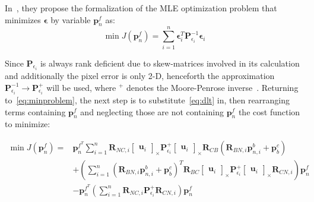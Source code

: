 In~\cite{absolute-triangulation}, they propose the formalization of the MLE optimization problem that minimizes $\boldsymbol{\epsilon}$ by variable $\mathbf{p}_n^f$ as:
\begin{equation}
    \min J(\mathbf{p}_n^f)=\sum_{i=1}^n\boldsymbol{\epsilon}_i^T\mathbf{P}_{\epsilon_i}^{-1}\boldsymbol{\epsilon}_i
    \label{eq:minproblem}
\end{equation}

Since $\mathbf{P}_{\epsilon_i}$ is always rank deficient due to skew-matrices involved in its calculation and additionally the pixel error is only 2-D, henceforth the approximation $\mathbf{P}_{\epsilon_i}^{-1}\rightarrow\mathbf{P}_{\epsilon_i}^{+}$ will be used, where $^+$ denotes the Moore-Penrose inverse~\cite{moorepenrose}. Returning to~\eqref{eq:minproblem}, the next step is to substitute~\eqref{eq:dlt} in, then rearranging terms containing $\mathbf{p}_n^f$ and neglecting those are not containing $\mathbf{p}_n^f$ the cost function to minimize:

\begin{equation}
\begin{aligned}
    \min J(\mathbf{p}_n^f) = & \mathbf{p}_n^{f^T}\sum_{i=1}^n \mathbf{R}_{NC, i}\begin{bmatrix}
        \mathbf{u}_i
    \end{bmatrix}_\times \mathbf{P}_{\epsilon_i}^{+} 
    \begin{bmatrix}
        \mathbf{u}_i
    \end{bmatrix}_\times
    \mathbf{R}_{CB}(\mathbf{R}_{BN, i}\mathbf{p}_{n, i}^b + \mathbf{p}_b^c) \\ &
     + \left(\sum_{i=1}^n{(\mathbf{R}_{BN, i}\mathbf{p}_{n, i}^b + \mathbf{p}_b^c)}^T\mathbf{R}_{BC}
    \begin{bmatrix}
        \mathbf{u}_i
    \end{bmatrix}_\times \mathbf{P}_{\epsilon_i}^{+}
    \begin{bmatrix}
        \mathbf{u}_i
    \end{bmatrix}_\times \mathbf{R}_{CN, i}\right) \mathbf{p}_n^f \\ &
    -\mathbf{p}_n^{f^T}\left( \sum_{i=1}^n \mathbf{R}_{NC, i}\mathbf{P}_{\epsilon_i}^{+}\mathbf{R}_{CN, i}\right)\mathbf{p}_n^f
\end{aligned}
\label{eq:costfunc}
\end{equation}

